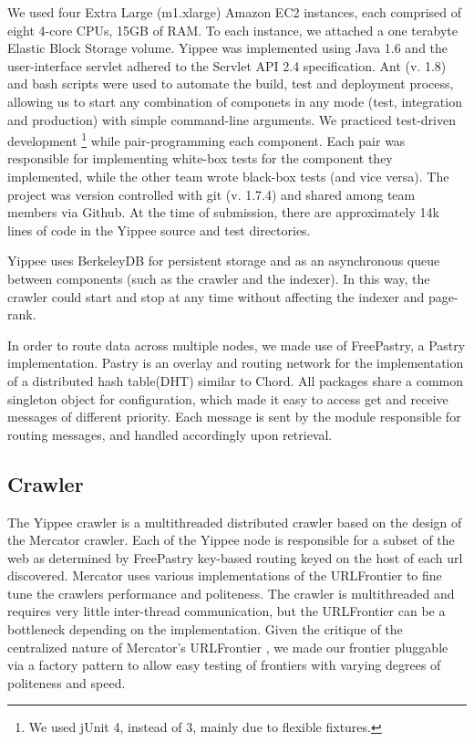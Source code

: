 \documentclass[11pt, letterpaper, oneside, twocolumn]{article}
\begin{document}
We used four Extra Large (m1.xlarge) Amazon EC2 instances, each comprised of eight 4-core CPUs, 15GB of RAM.
To each instance, we attached a one terabyte Elastic Block Storage volume. 
Yippee was implemented using Java 1.6 and the user-interface servlet adhered to the Servlet API 2.4 specification. 
Ant (v. 1.8) and bash scripts were used to automate the build, test and deployment process, allowing us to start any combination of componets in any mode (test, integration and production) with simple command-line arguments.
We practiced test-driven development \footnote{We used jUnit 4, instead of 3, mainly due to flexible fixtures.} while pair-programming each component.  Each pair was responsible for implementing white-box tests for the component they implemented, while the other team wrote black-box tests (and vice versa). 
The project was version controlled with git (v. 1.7.4) and shared among team members via Github.
At the time of submission, there are approximately 14k lines of code in the Yippee source and test directories.

Yippee uses BerkeleyDB for persistent storage and as an asynchronous queue between components (such as the crawler and the indexer). In this way, the crawler could start and stop at any time without affecting the indexer and page-rank.  

In order to route data across multiple nodes, we made use of FreePastry, a Pastry implementation. 
Pastry is an overlay and routing network for the implementation of a distributed hash table(DHT) similar to Chord. 
All packages share a common singleton object for configuration, which made it easy to access get and receive messages of different priority. 
Each message is sent by the module responsible for routing messages, and handled accordingly upon retrieval.

\subsection{Crawler}

The Yippee crawler is a multithreaded distributed crawler based on the design of the Mercator crawler\cite{mercator}. 
Each of the Yippee node is responsible for a subset of the web as determined by FreePastry key-based routing keyed on the host of each url discovered.
Mercator uses various implementations of the URLFrontier to fine tune the crawlers performance and politeness.
The crawler is multithreaded and requires very little inter-thread communication, but the URLFrontier can be a bottleneck depending on the implementation. 
Given the critique of the centralized nature of Mercator's URLFrontier \cite{ubi, para}, we made our frontier pluggable via a factory pattern to allow easy testing of frontiers with varying degrees of politeness and speed.
\end{document}
